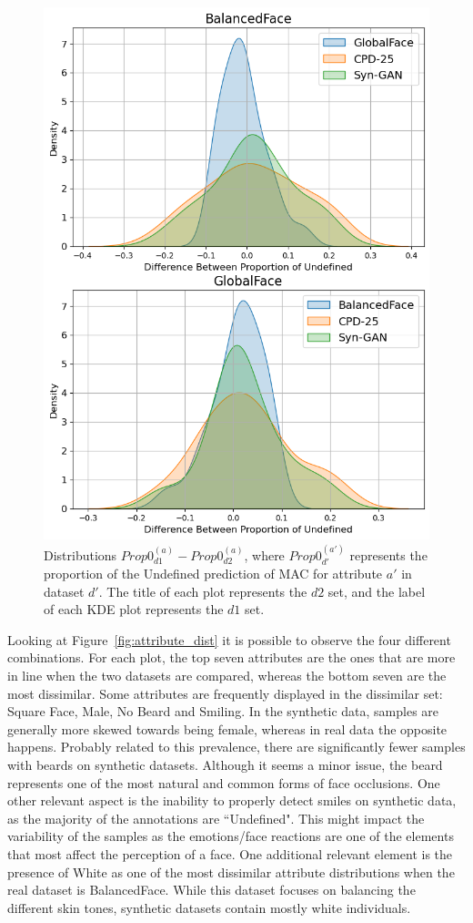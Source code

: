 \documentclass[a4paper, 10pt, conference]{ieeeconf}      %
\begin{document}
\begin{figure}
    \centering
    \includegraphics[width=0.85\linewidth]{diff_0_prop.png}
    \caption{Distributions $Prop0_{d1}^{(a)}-Prop0_{d2}^{(a)}$, where $Prop0_{d'}^{(a')}$ represents the proportion of the Undefined prediction of MAC for attribute $a'$ in dataset $d'$. The title of each plot represents the $d2$ set, and the label of each KDE plot represents the $d1$ set.}
    \label{fig:zero_prop_diff}
\end{figure}
Looking at Figure~\ref{fig:attribute_dist} it is possible to observe the four different combinations. For each plot, the top seven attributes are the ones that are more in line when the two datasets are compared, whereas the bottom seven are the most dissimilar. Some attributes are frequently displayed in the dissimilar set: Square Face, Male, No Beard and Smiling. In the synthetic data, samples are generally more skewed towards being female, whereas in real data the opposite happens. Probably related to this prevalence, there are significantly fewer samples with beards on synthetic datasets. Although it seems a minor issue, the beard represents one of the most natural and common forms of face occlusions. One other relevant aspect is the inability to properly detect smiles on synthetic data, as the majority of the annotations are ``Undefined". This might impact the variability of the samples as the emotions/face reactions are one of the elements that most affect the perception of a face. One additional relevant element is the presence of White as one of the most dissimilar attribute distributions when the real dataset is BalancedFace. While this dataset focuses on balancing the different skin tones, synthetic datasets contain mostly white individuals. 
\end{document}
